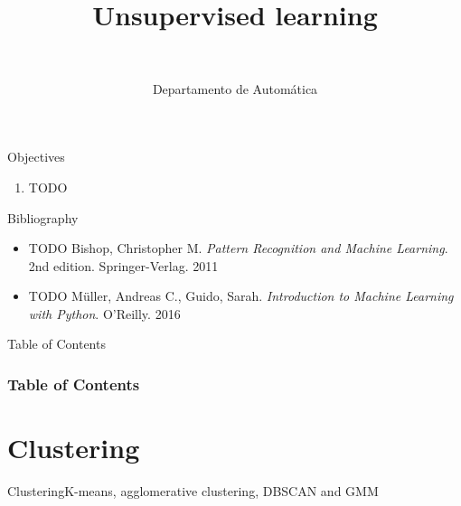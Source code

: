 \documentclass[10pt,compress]{beamer} %
\title[Unsupervised learning]{Unsupervised learning}
\author{\asignatura\\\carrera}
\institute{}
\date{Departamento de Automática}
\begin{document}
{\titlepageBlue
    \begin{frame}
        \titlepage
    \end{frame}
}

\institute{\asignatura}

\begin{frame}[plain]{}
   \begin{block}{Objectives}
      \begin{enumerate}
         \item TODO
      \end{enumerate} 
   \end{block}

   \begin{block}{Bibliography}
	\begin{itemize}
        \item TODO Bishop, Christopher M. \textit{Pattern Recognition and Machine Learning}. 2nd edition. Springer-Verlag. 2011
        \item TODO M\"uller, Andreas C., Guido, Sarah. \textit{Introduction to Machine Learning with Python}. O'Reilly. 2016
	\end{itemize}
   \end{block}
\end{frame}

{
\begin{frame}[shrink]{Table of Contents}

 	\frametitle{Table of Contents}
  	\begin{multicols}{2}
  		\tableofcontents
    \end{multicols}

\end{frame}
}

\section{Clustering}
{
\sectionheaderWhite %
\begin{frame}{Clustering}{K-means, agglomerative clustering, DBSCAN and GMM}
\end{frame}
}
\end{document}

